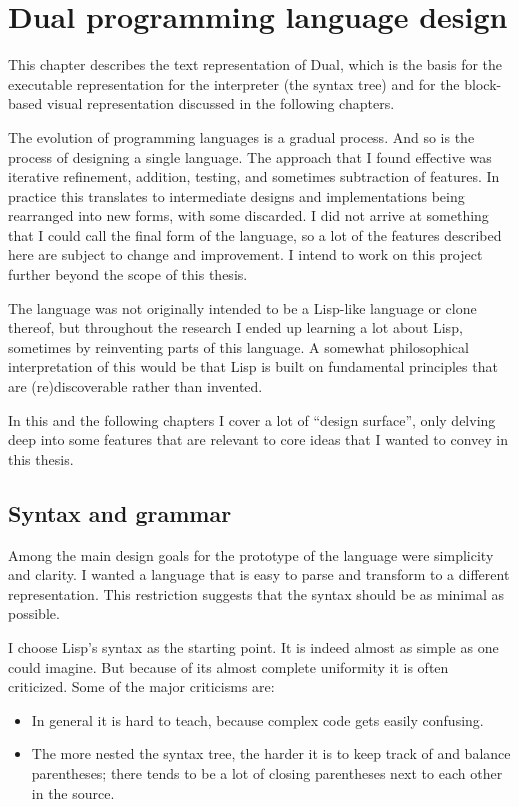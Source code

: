 \chapter{Dual programming language design}\label{chap:lang}
This chapter describes the text representation of Dual, which is the basis for the executable representation for the interpreter (the syntax tree) and for the block-based visual representation discussed in the following chapters.

The evolution of programming languages is a gradual process. And so is the process of designing a single language. The approach that I found effective was iterative refinement, addition, testing, and sometimes subtraction of features. In practice this translates to intermediate designs and implementations being rearranged into new forms, with some discarded. I did not arrive at something that I could call the final form of the language, so a lot of the features described here are subject to change and improvement. I intend to work on this project further beyond the scope of this thesis.

The language was not originally intended to be a Lisp-like language or clone thereof, but throughout the research I ended up learning a lot about Lisp, sometimes by reinventing parts of this language. A somewhat philosophical interpretation of this would be that Lisp is built on fundamental principles that are (re)discoverable rather than invented.

In this and the following chapters I cover a lot of ``design surface'', only delving deep into some features that are relevant to core ideas that I wanted to convey in this thesis.

\section{Syntax and grammar}
Among the main design goals for the prototype of the language were simplicity
and clarity. I wanted a language that is easy to parse and transform to a
different representation. This restriction suggests that the syntax should be as
minimal as possible.  

I choose Lisp's syntax as the starting point. It is indeed almost as simple as one could imagine. But because of its almost complete uniformity it is often criticized. Some of the major criticisms are:
\begin{itemize}
    \item In general it is hard to teach, because complex code gets easily confusing\cite{wadler_critique}.
    \item The more nested the syntax tree, the harder it is to keep track of and
      balance parentheses; there tends to be a lot of closing parentheses next
      to each other in the source\cite{c2_parentheses}.
\end{itemize}

